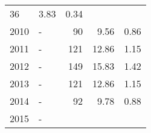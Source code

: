 \begin{longtable}{lXrrr}
       \num{36} &
       \num[round-mode=places,round-precision=2]{3.83} &
         \num[round-mode=places,round-precision=2]{0.34} \\

     2010 &
     \multicolumn{1}{X}{ -  } &


       \num{90} &
       \num[round-mode=places,round-precision=2]{9.56} &
         \num[round-mode=places,round-precision=2]{0.86} \\

     2011 &
     \multicolumn{1}{X}{ -  } &


       \num{121} &
       \num[round-mode=places,round-precision=2]{12.86} &
         \num[round-mode=places,round-precision=2]{1.15} \\

     2012 &
     \multicolumn{1}{X}{ -  } &


       \num{149} &
       \num[round-mode=places,round-precision=2]{15.83} &
         \num[round-mode=places,round-precision=2]{1.42} \\

     2013 &
     \multicolumn{1}{X}{ -  } &


       \num{121} &
       \num[round-mode=places,round-precision=2]{12.86} &
         \num[round-mode=places,round-precision=2]{1.15} \\

     2014 &
     \multicolumn{1}{X}{ -  } &


       \num{92} &
       \num[round-mode=places,round-precision=2]{9.78} &
         \num[round-mode=places,round-precision=2]{0.88} \\

     2015 &
     \multicolumn{1}{X}{ -  } &



\end{longtable}
